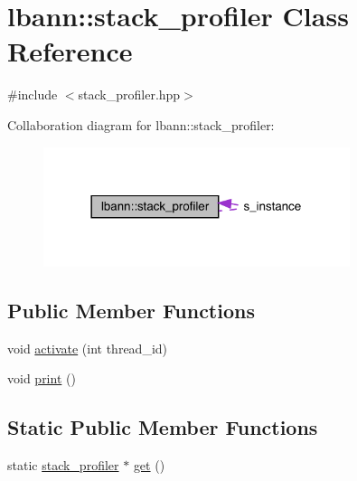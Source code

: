 \hypertarget{classlbann_1_1stack__profiler}{}\section{lbann\+:\+:stack\+\_\+profiler Class Reference}
\label{classlbann_1_1stack__profiler}


{\ttfamily \#include $<$stack\+\_\+profiler.\+hpp$>$}



Collaboration diagram for lbann\+:\+:stack\+\_\+profiler\+:\nopagebreak
\begin{figure}[H]
\begin{center}
\leavevmode
\includegraphics[width=254pt]{classlbann_1_1stack__profiler__coll__graph}
\end{center}
\end{figure}
\subsection*{Public Member Functions}
\begin{DoxyCompactItemize}
\item 
void \hyperlink{classlbann_1_1stack__profiler_a5c8e2ec1f36d36ff8211ec8910063777}{activate} (int thread\+\_\+id)
\item 
void \hyperlink{classlbann_1_1stack__profiler_a27d55f6551cf445d3d0e9836858f6872}{print} ()
\end{DoxyCompactItemize}
\subsection*{Static Public Member Functions}
\begin{DoxyCompactItemize}
\item 
static \hyperlink{classlbann_1_1stack__profiler}{stack\+\_\+profiler} $\ast$ \hyperlink{classlbann_1_1stack__profiler_ab1a7c0531a78ad7e2181a10daee44def}{get} ()
\end{DoxyCompactItemize}

